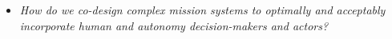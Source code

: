 \begin{itemize}
\item {\em How do we co-design complex mission systems to optimally and acceptably incorporate human and autonomy decision-makers and actors?}
\end{itemize}




